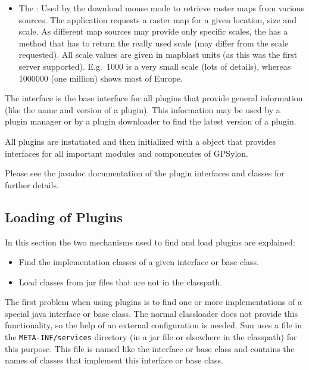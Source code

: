 \documentclass[a4paper]{article} %
\begin{document}
\begin{itemize}
\item The : Used by the download mouse
  mode to retrieve raster maps from various sources. The application
  requests a raster map for a given location, size and scale. As
  different map sources may provide only specific scales, the
   has a method that has to return
  the really used scale (may differ from the scale requested). All
  scale values are given in mapblast units (as this was the first
  server supported). E.g.\ 1000 is a very small scale (lots of
  details), whereas 1000000 (one million) shows most of Europe.

\end{itemize}

The interface  is the base interface for all
plugins that provide general information (like the name and version of
a plugin). This information may be used by a plugin manager or by a
plugin downloader to find the latest version of a plugin.

All plugins are instatiated and then initialized with a
 object that provides interfaces for all
important modules and componentes of GPSylon.

Please see the javadoc documentation of the plugin interfaces and
classes for further details.

\subsection{Loading of Plugins}
\label{SoftwareDesignOfTheGpstoolPackage-LoadingOfPlugins}

In this section the two mechanisms used to find and load plugins are
explained: 

\begin{itemize}

\item Find the implementation classes of a given interface or base
class. 

\item Load classes from jar files that are not in the classpath.

\end{itemize}

The first problem when using plugins is to find one or more
implementations of a special java interface or base class. The normal
classloader does not provide this functionality, so the help of an
external configuration is needed. Sun uses a file in the
\texttt{META-INF/services} directory (in a jar file or elsewhere in
the classpath) for this purpose. This file is named like the interface
or base class and contains the names of classes that implement this
interface or base class.
\end{document}
